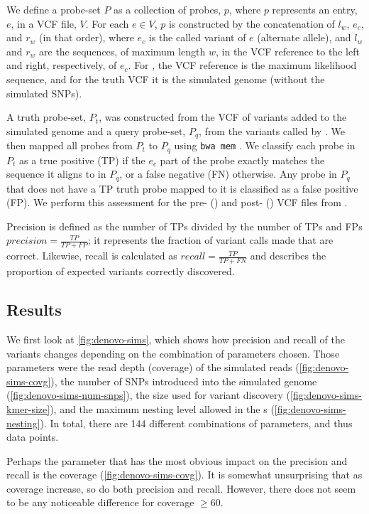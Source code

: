 We define a probe-set $P$ as a collection of probes, $p$, where $p$ represents an entry, $e$, in a VCF file, $V$. For each $e \in V$, $p$ is constructed by the concatenation of $l_w$, $e_c$, and $r_w$ (in that order), where $e_c$ is the called variant of $e$ (alternate allele), and $l_w$ and $r_w$ are the sequences, of maximum length $w$, in the VCF reference to the left and right, respectively, of $e_c$. For \pandora{}, the VCF reference is the maximum likelihood sequence, and for the truth VCF it is the simulated genome (without the simulated SNPs).

A truth probe-set, $P_t$, was constructed from the VCF of variants added to the simulated genome and a query probe-set, $P_q$, from the variants called by \pandora{}. We then mapped all probes from $P_t$ to $P_q$ using \texttt{bwa mem} \cite{li2013}. We classify each probe in $P_t$ as a true positive (TP) if the $e_c$ part of the probe exactly matches the sequence it aligns to in $P_q$, or a false negative (FN) otherwise. Any probe in $P_q$ that does not have a TP truth probe mapped to it is classified as a false positive (FP). We perform this assessment for the pre-\denovo{} () and post-\denovo{} () VCF files from \pandora{}. 

Precision is defined as the number of TPs divided by the number of TPs and FPs $precision=\frac{TP}{TP+FP}$; it represents the fraction of variant calls made that are correct. Likewise, recall is calculated as $recall=\frac{TP}{TP+FN}$ and describes the proportion of expected variants correctly discovered.

\subsection{Results}

We first look at \autoref{fig:denovo-sims}, which shows how precision and recall of the \pandora{} \denovo{} variants changes depending on the combination of parameters chosen. Those parameters were the read depth (coverage) of the simulated reads (\autoref{fig:denovo-sims-covg}), the number of SNPs introduced into the simulated genome (\autoref{fig:denovo-sims-num-snps}), the \kmer{} size used for variant discovery (\autoref{fig:denovo-sims-kmer-size}), and the maximum nesting level allowed in the \prg{}s (\autoref{fig:denovo-sims-nesting}). In total, there are 144 different combinations of parameters, and thus data points.

Perhaps the parameter that has the most obvious impact on the precision and recall is the coverage (\autoref{fig:denovo-sims-covg}). It is somewhat unsurprising that as coverage increase, so do both precision and recall. However, there does not seem to be any noticeable difference for coverage $\ge 60$.

